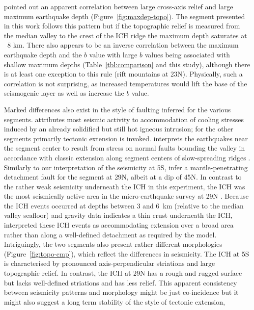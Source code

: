\documentclass[jgr]{agu2001}
\newlength{\tw}
\begin{document}
\begin{article}
\citet{barclay01} pointed out an apparent correlation between
large cross-axis relief and large maximum earthquake depth
(Figure~\ref{fig:maxdep-topo}).  The segment presented in this work
follows this pattern but if the topographic relief is measured
from the median valley to the crest of the ICH ridge the maximum depth saturates at ~8 km.
There also appears to be an inverse correlation
between the maximum earthquake depth and the $b$ value with
large $b$ values being associated with shallow maximum depths
(Table~\ref{tbl:comparison} and this study),
although there is at least one exception to this rule (rift mountains
at 23\dg N).  Physically, such a correlation is not surprising, as
increased temperatures would lift the base of the seismogenic
layer as well as increase the $b$ value.  

Marked differences also
exist in  the style of faulting inferred for the various segments.
\citet{kong92} attributes most seismic activity to accommodation of
cooling stresses induced by an already solidified but still hot
igneous intrusion; for the other segments primarily tectonic extension
is invoked.  \citet{barclay01} interprets the earthquakes 
 near the
segment center to result from  stress on normal faults bounding the
valley in accordance with classic extension along segment centers of
slow-spreading ridges \citep{mutter92}.   Similarly to our
interpretation of the seismicity at 5\dg S, \citet{toomey88} infer a
mantle-penetrating detachment fault for the segment at 29\dg N, albeit
at a dip of 45\dg N.  In contrast to the rather weak seismicity
underneath the ICH in this experiment, the ICH was the most
seismically active area in the micro-earthquake survey at 29\dg N
\citep{wolfe95}. Because the ICH events occurred at depths between 3
and 6~km (relative to the median valley seafloor) and gravity data
indicates a thin crust underneath the ICH, \citet{wolfe95} interpreted
these ICH events as accommodating extension over a broad area rather
than along a well-defined detachment as required by the
\citet{tucholke94} model.   Intriguingly, the two segments also
present rather different morphologies (Figure~\ref{fig:topo-cmp}),
which reflect the differences in seismicity.  The ICH at
5\dg S is characterised by pronounced axis-perpendicular striations
and large topographic relief.  In contrast, the ICH at 29\dg N has a
rough and rugged surface but lacks well-defined striations and has
less relief.  This apparent consistency between seismicity patterns
and morphology might  be just co-incidence but it might also
suggest a long term stability of the style of tectonic extension,

\end{article}
\end{document}
